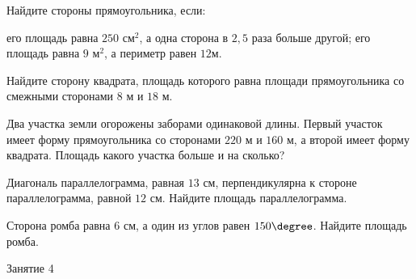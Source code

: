 \begin{class}[number=3]
	\begin{listofex}
		\item Найдите стороны прямоугольника, если: %
		\begin{tasks}
			\task его площадь равна \( 250 \) см\(^2\), а одна сторона в \(2,5\) раза больше другой;
			\task его площадь равна \( 9 \) м\(^2\), а периметр равен \(12\)м.
		\end{tasks}
		\item Найдите сторону квадрата, площадь которого равна площади прямоугольника со смежными сторонами \(8\) м и \(18\) м. %
		\item Два участка земли огорожены заборами одинаковой длины. Первый участок имеет форму прямоугольника со сторонами \(220\) м и \(160\) м, а второй имеет форму квадрата. Площадь какого участка больше и на сколько? %
		\item Диагональ параллелограмма, равная \(13\) см, перпендикулярна к стороне параллелограмма, равной \(12\) см. Найдите площадь параллелограмма. %
		\item Сторона ромба равна \(6\) см, а один из углов равен \(150 \degree\). Найдите площадь ромба. %
	\end{listofex}
\end{class}

\begin{class}[number=4]
	\begin{listofex}
		\item Занятие 4
	\end{listofex}
\end{class}

